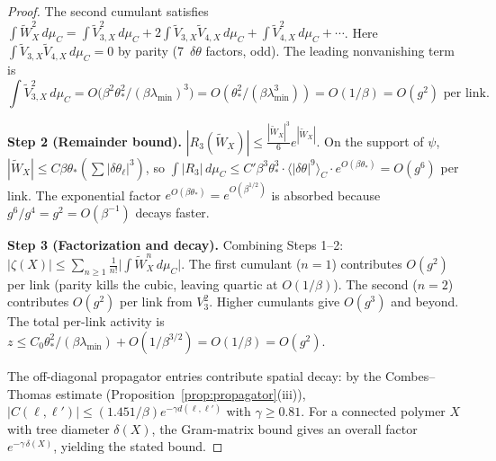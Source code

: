 \documentclass[11pt]{article}
\theoremstyle{definition}
\begin{document}
\begin{proof}
The second cumulant satisfies
$\int\widetilde{W}_X^2\,d\mu_C
=\int\widetilde{V}_{3,X}^2\,d\mu_C
+2\int\widetilde{V}_{3,X}\widetilde{V}_{4,X}\,d\mu_C
+\int\widetilde{V}_{4,X}^2\,d\mu_C+\cdots$.
Here $\int\widetilde{V}_{3,X}\widetilde{V}_{4,X}\,d\mu_C=0$ by parity
(7~$\delta\theta$ factors, odd).  The leading nonvanishing
term is
\begin{equation}
\int\widetilde{V}_{3,X}^2\,d\mu_C
=O\bigl(\beta^2\theta_*^2/(\beta\lambda_{\min})^3\bigr)
=O(\theta_*^2/(\beta\lambda_{\min}^3))=O(1/\beta)=O(g^2)\text{ per link}.
\end{equation}

\textbf{Step 2 (Remainder bound).}
$|R_3(\widetilde{W}_X)|\le\frac{|\widetilde{W}_X|^3}{6}
e^{|\widetilde{W}_X|}$.
On the support of $\psi$, $|\widetilde{W}_X|
\le C\beta\theta_*(\sum|\delta\theta_\ell|^3)$, so
$\int|R_3|\,d\mu_C\le C'\beta^3\theta_*^3\cdot
\langle|\delta\theta|^9\rangle_C\cdot e^{O(\beta\theta_*)}
=O(g^6)$ per link.  The exponential factor
$e^{O(\beta\theta_*)}=e^{O(\beta^{1/2})}$ is absorbed because
$g^6/g^4=g^2=O(\beta^{-1})$ decays faster.

\textbf{Step 3 (Factorization and decay).}
Combining Steps 1--2:
$|\zeta(X)|\le\sum_{n\ge 1}\frac{1}{n!}\bigl|\int\widetilde{W}_X^n
\,d\mu_C\bigr|$.
The first cumulant ($n=1$) contributes $O(g^2)$ per link (parity
kills the cubic, leaving quartic at $O(1/\beta)$).  The second ($n=2$) contributes
$O(g^2)$ per link from $V_3^2$.  Higher cumulants give $O(g^3)$
and beyond.  The total per-link activity is
$z\le C_0\theta_*^2/(\beta\lambda_{\min})+O(1/\beta^{3/2})
=O(1/\beta)=O(g^2)$.

The off-diagonal propagator entries contribute spatial decay:
by the Combes--Thomas estimate
(Proposition~\ref{prop:propagator}(iii)),
$|C(\ell,\ell')|\le(1.451/\beta)e^{-\gamma d(\ell,\ell')}$
with $\gamma\ge 0.81$.
For a connected polymer $X$ with tree diameter $\delta(X)$, the
Gram-matrix bound gives an overall factor $e^{-\gamma\,\delta(X)}$,
yielding the stated bound.
\end{proof}
\end{document}
